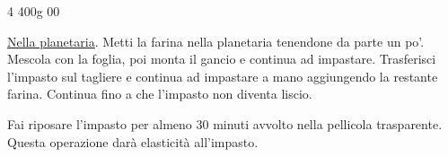 \cooktime[]{-}%
\begin{ingreds}
	4 
	400g  00

\end{ingreds}

\begin{method}
\underline{Nella planetaria}. Metti la farina nella planetaria tenendone da parte un po'. Mescola con la foglia, poi monta il gancio e continua ad impastare. Trasferisci l'impasto sul tagliere e continua ad impastare a mano aggiungendo la restante farina. Continua fino a che l'impasto non diventa liscio.

Fai riposare l'impasto per almeno 30 minuti avvolto nella pellicola trasparente. Questa operazione darà elasticità all'impasto.

\end{method}




